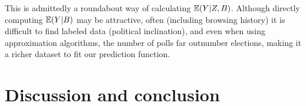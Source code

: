 \documentclass[12pt]{article}
\begin{document}
This is admittedly a roundabout way of calculating $\mathbb{E}(Y|Z,B)$. Although directly computing $\mathbb{E}(Y|B)$ may be attractive, often (including browsing history) it is difficult to find labeled data (political inclination), and even when using approximation algorithms, the number of polls far outnumber elections, making it a richer dataset to fit our prediction function.


\section{Discussion and conclusion}
\label{sec:conc}



\end{document}
